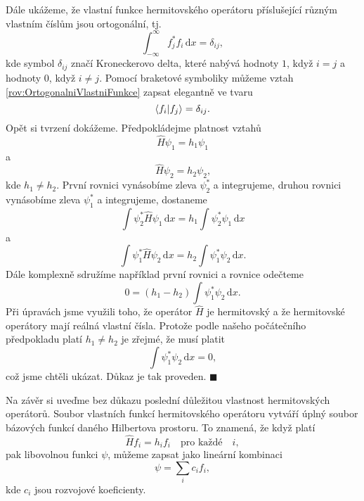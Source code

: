 Dále ukážeme, že vlastní funkce hermitovského operátoru příslušející různým vlastním číslům jsou ortogonální, tj.
\begin{equation}
\boxed{\int_{-\infty}^{\infty} f_j^\ast f_i \,\mathrm{d}x = \delta_{ij},}
\label{rov:OrtogonalniVlastniFunkce}
\end{equation}
kde symbol $\delta_{ij}$ značí Kroneckerovo delta, které nabývá hodnoty $1$, když $i=j$ a hodnoty $0$, když $i \not = j$. Pomocí braketové symboliky můžeme vztah \eqref{rov:OrtogonalniVlastniFunkce} zapsat elegantně ve tvaru
\begin{equation}
\braket{f_i|f_j} = \delta_{ij}.
\nonumber
\end{equation}
Opět si tvrzení dokážeme. Předpokládejme platnost vztahů
\begin{equation}
\hat{H} \psi_1 = h_1 \psi_1
\nonumber
\end{equation}
a
\begin{equation}
\hat{H} \psi_2 = h_2 \psi_2 \mbox{,}
\nonumber
\end{equation}
kde $h_1 \not = h_2$. První rovnici vynásobíme zleva $\psi_2^\ast$ a integrujeme, druhou rovnici vynásobíme zleva $\psi_1^\ast$ a integrujeme, dostaneme
\begin{equation}
\int \psi_2^\ast \hat{H} \psi_1 \,\mathrm{d}x  = h_1 \int \psi_2^\ast \psi_1 \,\mathrm{d}x
\nonumber
\end{equation}
a
\begin{equation}
\int \psi_1^\ast \hat{H} \psi_2 \,\mathrm{d}x  = h_2 \int \psi_1^\ast \psi_2 \,\mathrm{d}x.
\nonumber
\end{equation}
Dále komplexně sdružíme například první rovnici a rovnice odečteme
\begin{equation}
0 = (h_1 - h_2 ) \int \psi_1^\ast \psi_2 \,\mathrm{d}x.
\nonumber
\end{equation}
Při úpravách jsme využili toho, že operátor $\hat{H}$ je hermitovský a že hermitovské operátory mají reálná vlastní čísla. Protože podle našeho počátečního předpokladu platí $h_1 \not = h_2$ je zřejmé, že musí platit
\begin{equation}
\int \psi_1^\ast \psi_2 \,\mathrm{d}x = 0,
\nonumber
\end{equation}
což jsme chtěli ukázat. Důkaz je tak proveden. \hfill {\footnotesize $\blacksquare$}

Na závěr si uveďme bez důkazu poslední důležitou vlastnost hermitovských operátorů. Soubor vlastních funkcí hermitovského operátoru vytváří úplný soubor bázových funkcí daného Hilbertova prostoru. To znamená, že když platí
\begin{equation}
\hat{H} f_i = h_i f_i \quad \mbox{pro každé}\quad i,
\nonumber
\end{equation}
pak libovolnou funkci $\psi$, můžeme zapsat jako lineární kombinaci
\begin{equation}
\psi = \sum_{i} c_i f_i,
\nonumber
\end{equation}
kde $c_i$ jsou rozvojové koeficienty.



